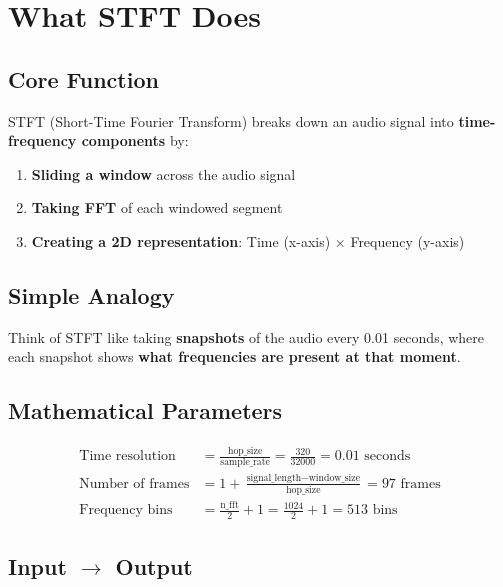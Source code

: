 \documentclass[12pt]{article}
\begin{document}
\section{What STFT Does}

\subsection{Core Function}
STFT (Short-Time Fourier Transform) breaks down an audio signal into \textbf{time-frequency components} by:

\begin{enumerate}
    \item \textbf{Sliding a window} across the audio signal
    \item \textbf{Taking FFT} of each windowed segment
    \item \textbf{Creating a 2D representation}: Time (x-axis) $\times$ Frequency (y-axis)
\end{enumerate}

\subsection{Simple Analogy}
Think of STFT like taking \textbf{snapshots} of the audio every 0.01 seconds, where each snapshot shows \textbf{what frequencies are present at that moment}.

\subsection{Mathematical Parameters}
\begin{align}
\text{Time resolution} &= \frac{\text{hop\_size}}{\text{sample\_rate}} = \frac{320}{32000} = 0.01 \text{ seconds} \\
\text{Number of frames} &= 1 + \frac{\text{signal\_length} - \text{window\_size}}{\text{hop\_size}} = 97 \text{ frames} \\
\text{Frequency bins} &= \frac{\text{n\_fft}}{2} + 1 = \frac{1024}{2} + 1 = 513 \text{ bins}
\end{align}

\subsection{Input $\rightarrow$ Output}
\begin{center}
\end{center}
\end{document}
